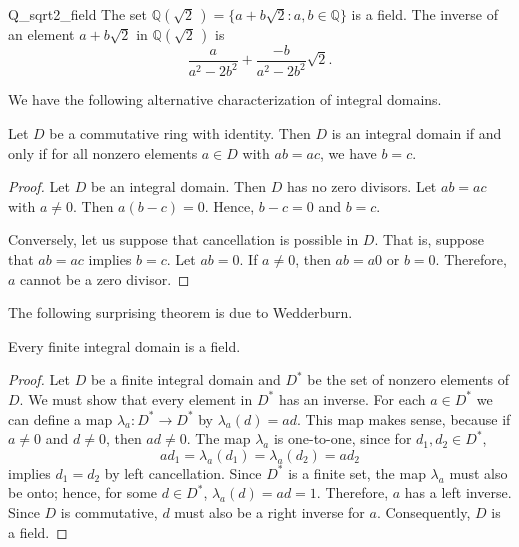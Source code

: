  
\begin{example}{Q_sqrt2_field}
The set ${\mathbb Q}( \sqrt{2}\, ) = \{ a + b \sqrt{2} : a, b \in {\mathbb Q}
\}$ is a field. The inverse of an element $a + b \sqrt{2}$ in ${\mathbb
Q}( \sqrt{2}\, )$ is  
\[
\frac{a}{a^2 - 2 b^2} +\frac{- b}{ a^2 - 2 b^2} \sqrt{2}.
\]
\end{example}
 
 

 
 
We have the following alternative characterization of integral
domains. 
 
 

 
 
\begin{proposition}
Let $D$ be a commutative ring with identity. Then $D$ is an integral
domain if and only if for all nonzero elements $a \in D$ with $ab =
ac$, we have $b=c$. 
\end{proposition}
 
 
\begin{proof}
Let $D$ be an integral domain. Then $D$ has no zero divisors.  Let $ab
= ac$ with $a \neq 0$. Then $a(b - c) =0$.  Hence, $b - c = 0$ and $b
= c$. 
 
 
Conversely, let us suppose that cancellation is possible in $D$.
That is, suppose that $ab = ac$ implies $b=c$. Let $ab = 0$.  If $a
\neq 0$, then $ab = a 0$ or $b=0$.  Therefore, $a$ cannot be a zero
divisor. 
\end{proof}
 
 
\medskip
 
 
The following surprising theorem is due to Wedderburn.
 
 
\begin{theorem}
Every finite integral domain is a field.
\end{theorem}
 
 
\begin{proof}
Let $D$ be a finite integral domain and $D^\ast$ be the set of nonzero
elements of $D$.  We must show that every element in $D^*$ has an
inverse. For each $a \in D^\ast$ we can define a map $\lambda_a :
D^\ast \rightarrow D^\ast$ by $\lambda_a(d) = ad$.  This map makes
sense, because if  $a \neq 0$ and $d \neq 0$, then $ad \neq 0$.  The map
$\lambda_a$ is one-to-one, since for $d_1, d_2 \in D^*$, 
\[
ad_1 = \lambda_a(d_1) = \lambda_a(d_2) = ad_2
\]
implies $d_1 = d_2$ by left cancellation. Since $D^\ast$ is a finite
set, the map $\lambda_a$ must also be onto; hence, for some $d \in
D^\ast$, $\lambda_a(d) = ad = 1$. Therefore, $a$ has a left inverse.
Since $D$ is commutative, $d$ must also be a right inverse for $a$.
Consequently, $D$ is a field. 
\end{proof}
 
